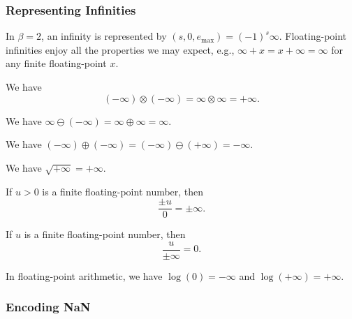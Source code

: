 \subsubsection{Representing Infinities}

In $\beta=2$, an infinity is represented by $(s,0,e_{\text{max}})=(-1)^{s}\infty$.
Floating-point infinities enjoy all the properties we may expect, e.g.,
$\infty + x = x + \infty = \infty$ for any finite floating-point $x$.

\begin{axiom}
  We have
  \begin{equation*}
    (-\infty)\otimes(-\infty) = \infty\otimes\infty = +\infty.
  \end{equation*}
\end{axiom}

\begin{axiom}
  We have $\infty\ominus(-\infty)=\infty\oplus\infty=\infty$.
\end{axiom}

\begin{axiom}
  We have $(-\infty)\oplus(-\infty)=(-\infty)\ominus(+\infty)=-\infty$.
\end{axiom}

\begin{axiom}
  We have $\sqrt{+\infty}=+\infty$.
\end{axiom}

\begin{axiom}
  If $u>0$ is a finite floating-point number, then
  \begin{equation*}
    \frac{\pm u}{0} = \pm\infty.
  \end{equation*}
\end{axiom}

\begin{axiom}
  If $u$ is a finite floating-point number, then
  \begin{equation*}
    \frac{u}{\pm\infty}=0.
  \end{equation*}
\end{axiom}

\begin{axiom}
In floating-point arithmetic, we have $\log(0)=-\infty$ and $\log(+\infty)=+\infty$.
\end{axiom}

\subsubsection{Encoding NaN}

